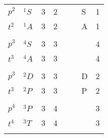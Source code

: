 \documentclass[11pt,fleqn]{article}
\begin{document}
\begin{table}
\begin{centering}
\begin{tabular}{lllllllr}
\\
 $p^{2}$   & $^{1}S$                 &   3 & 2   & & & S &  1 \\
 $t^{2}$   & $^{1}A$                 &   3 & 2   & & & A &  1 \\
\\
 $p^{3}$   & $^{4}S$                 &   3 & 3   & & &  &  4 \\
 $t^{3}$   & $^{4}A$                 &   3 & 3   & & &  &  4\\
\\
 $p^{3}$   & $^{2}D$                 &   3 & 3   & & & D &  2 \\
 $t^{3}$   & $^{2}P$                 &   3 & 3   & & & P &  2\\
\\
 $p^{4}$   & $^{3}P$                 &   3 & 4   & & &   &  3 \\
 $t^{4}$   & $^{3}T$                 &   3 & 4   & & &   &  3\\
\\ \hline \hline
\end{tabular}

\end{centering}
\end{table}
\clearpage
\end{document}
